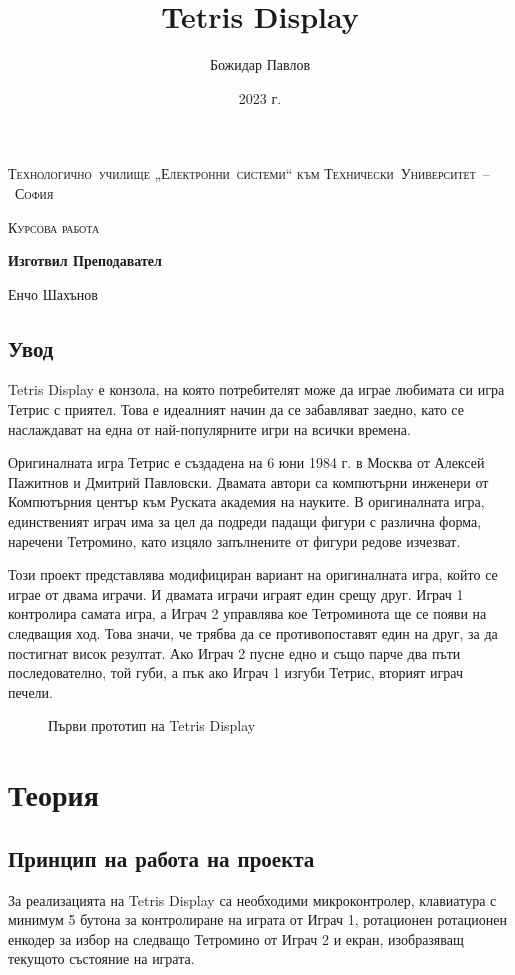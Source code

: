 \documentclass[titlepage, oneside, 14pt]{extbook}
\author{Божидар Павлов}
\title{Tetris Display}
\date{2023 г.}
\renewcommand{\texttt}[1]{{\small\ttfamily #1}}
\renewcommand{\maketitle}
{
    \begin{titlepage}
        \centering
        {\large\scshape Технологично~училище „Електронни~системи“ към Технически~Университет~–~София\par}
        \vfill
        {\LARGE\scshape\mdseries Курсова работа\par}
        \vspace{1cm}
        {\Huge\bfseries\thetitle\par}
        \vfill
        {\large\bfseries Изготвил \hfill Преподавател\par}
        {\Large\theauthor \hfill Енчо Шахънов\par}
        \vspace{1cm}
        {\large\thedate\par}
    \end{titlepage}
}
\begin{document}
\maketitle

\setcounter{page}{2}

\section*{Увод}

\textmd{Tetris Display} е конзола, на която потребителят може да играе любимата си игра
\textmd{Тетрис} с приятел. Това е идеалният начин да се забавляват заедно, като се
наслаждават на една от най-популярните игри на всички времена.

Оригиналната игра Тетрис е създадена на 6 юни 1984 г. в Москва от Алексей
Пажитнов и Дмитрий Павловски. Двамата автори са компютърни инженери от
Компютърния център към Руската академия на науките. В оригиналната игра,
единственият играч има за цел да подреди падащи фигури с различна форма,
наречени Тетромино, като изцяло запълнените от фигури редове изчезват.

Този проект представлява модифициран вариант на оригиналната игра, който се играе от двама играчи.
И двамата играчи играят един срещу друг. Играч 1 контролира самата игра, а Играч 2 управлява кое Тетроминота
ще се появи на следващия ход. Това значи, че трябва да се противопоставят един на
друг, за да постигнат висок резултат. Ако Играч 2 пусне
едно и също парче два пъти последователно, той губи, а пък ако Играч 1 изгуби \textmd{Тетрис},
вторият играч печели.

\vfill

\begin{figure}[!htbp]
    \centering
    \texttt{[image: img/prototype1.png]}
    \caption{Първи прототип на \textmd{Tetris Display}}
\end{figure}

\chapter{Теория}

\section{Принцип на работа на проекта}

За реализацията на \textmd{Tetris Display} са необходими микроконтролер,
клавиатура с минимум 5 бутона за контролиране на играта от Играч 1, ротационен
ротационен енкодер за избор на следващо Тетромино от Играч 2 и екран, изобразяващ текущото
състояние на играта.
\end{document}
